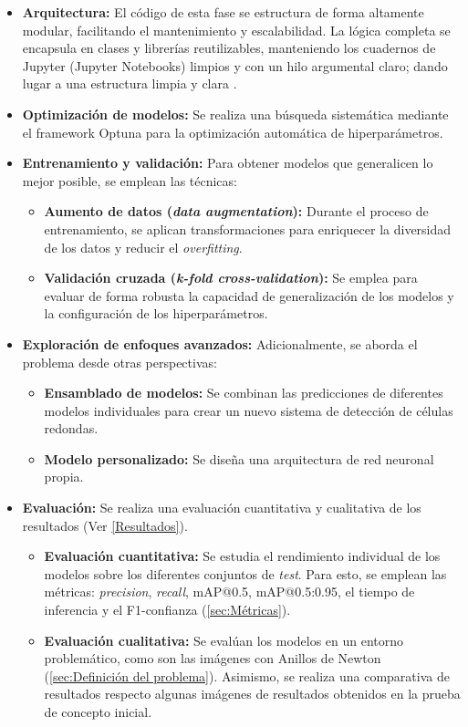 \documentclass[12pt,a4paper,onecolumn,oneside]{report}
\begin{document}
\begin{itemize}
  \item \textbf{Arquitectura:} El código de esta fase se estructura de forma altamente modular, facilitando el mantenimiento y escalabilidad. La lógica completa se encapsula en clases y librerías reutilizables, manteniendo los cuadernos de Jupyter 
  (Jupyter Notebooks) limpios y con un hilo argumental claro; dando lugar a una estructura limpia y clara \cite{repoTFM}.
  \item \textbf{Optimización de modelos:} Se realiza una búsqueda sistemática mediante el framework Optuna \cite{Optuna} para la optimización automática de hiperparámetros.
  \item \textbf{Entrenamiento y validación:} Para obtener modelos que generalicen lo mejor posible, se emplean las técnicas:
  \begin{itemize}
    \item \textbf{Aumento de datos (\textit{data augmentation}):} Durante el proceso de entrenamiento, se aplican transformaciones para enriquecer la diversidad de los datos y reducir el \textit{overfitting}.
    \item \textbf{Validación cruzada (\textit{k-fold cross-validation}):} Se emplea para evaluar de forma robusta la capacidad de generalización de los modelos y la configuración de los hiperparámetros.
  \end{itemize} 
  \item \textbf{Exploración de enfoques avanzados:} Adicionalmente, se aborda el problema desde otras perspectivas:
  \begin{itemize}
    \item \textbf{Ensamblado de modelos:} Se combinan las predicciones de diferentes modelos individuales para crear un nuevo sistema de detección de células redondas. 
    \item \textbf{Modelo personalizado:} Se diseña una arquitectura de red neuronal propia. 
  \end{itemize}
  \item \textbf{Evaluación:} Se realiza una evaluación cuantitativa y cualitativa de los resultados (Ver \autoref{Resultados}).
  \begin{itemize}
    \item \textbf{Evaluación cuantitativa:} Se estudia el rendimiento individual de los modelos sobre los diferentes conjuntos de \textit{test}. Para esto, se emplean las métricas: 
    \textit{precision}, \textit{recall}, mAP@0.5, mAP@0.5:0.95, el tiempo de inferencia y el F1-confianza (\autoref{sec:Métricas}). 
    \item \textbf{Evaluación cualitativa:} Se evalúan los modelos en un entorno problemático, como son las imágenes con Anillos de Newton (\autoref{sec:Definición del problema}). Asimismo, se realiza una comparativa de resultados respecto algunas imágenes de resultados obtenidos en la prueba de concepto inicial. 
  \end{itemize}
\end{itemize}
\end{document}
